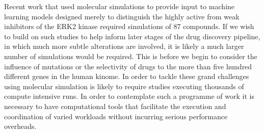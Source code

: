 Recent work that used molecular simulations to provide input to machine learning 
models \cite{Ash2017} designed merely to distinguish the highly active from weak 
inhibitors of the ERK2 kinase required simulations of 87 compounds.
If we wish to build on such studies to help inform later stages of the drug 
discovery pipeline, in which much more subtle alterations are involved, it is 
likely a much larger number of simulations would be required.
This is before we begin to consider the influence of mutations or the selectivity 
of drugs to the more than five hundred different genes in the human kinome. 
\cite{Li2016} In order to tackle these grand challenges using molecular simulation is 
likely to require studies executing thousands of compute intensive runs.
In order to contemplate such a programme of work it is necessary to
have computational tools that facilitate the execution and coordination of
varied workloads without incurring serious performance overheads.






